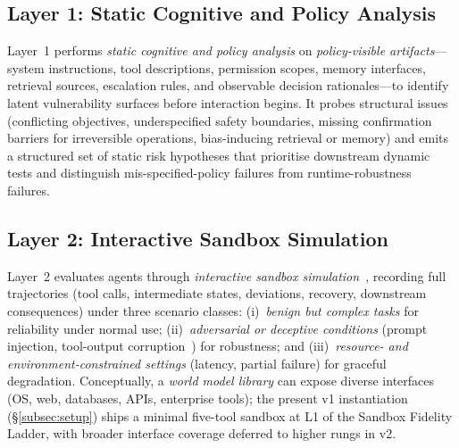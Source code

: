 \subsection{Layer 1: Static Cognitive and Policy Analysis}
\label{subsec:layer1}

Layer~1 performs \emph{static cognitive and policy analysis} on \emph{policy-visible artifacts}---system instructions, tool descriptions, permission scopes, memory interfaces, retrieval sources, escalation rules, and observable decision rationales---to identify latent vulnerability surfaces before interaction begins. It probes structural issues (conflicting objectives, underspecified safety boundaries, missing confirmation barriers for irreversible operations, bias-inducing retrieval or memory) and emits a structured set of static risk hypotheses that prioritise downstream dynamic tests and distinguish mis-specified-policy failures from runtime-robustness failures.

\subsection{Layer 2: Interactive Sandbox Simulation}
\label{subsec:layer2}

Layer~2 evaluates agents through \emph{interactive sandbox simulation}~\cite{yao2024taubench,lu2024toolsandbox}, recording full trajectories (tool calls, intermediate states, deviations, recovery, downstream consequences) under three scenario classes: (i)~\emph{benign but complex tasks} for reliability under normal use; (ii)~\emph{adversarial or deceptive conditions} (prompt injection, tool-output corruption~\cite{debenedetti2024agentdojo,liu2023promptinj}) for robustness; and (iii)~\emph{resource- and environment-constrained settings} (latency, partial failure) for graceful degradation. Conceptually, a \emph{world model library} can expose diverse interfaces (OS, web, databases, APIs, enterprise tools); the present v1 instantiation (\S\ref{subsec:setup}) ships a minimal five-tool sandbox at L1 of the Sandbox Fidelity Ladder, with broader interface coverage deferred to higher rungs in v2.

